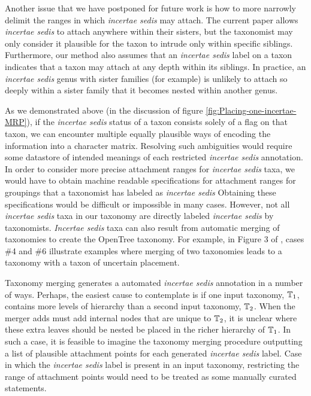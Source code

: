 \documentclass[english]{article}
\begin{document}
Another issue that we have postponed for future work is how to more narrowly delimit
the ranges in which \emph{incertae sedis} may attach.  The current paper allows
\emph{incertae sedis} to attach anywhere within their sisters, but the taxonomist
may only consider it plausible for the taxon to intrude only within specific
siblings.  Furthermore, our method also assumes that an \emph{incertae sedis} label on a taxon
indicates that a taxon may attach at any depth within its siblings.  In practice, an
\emph{incertae sedis} genus with sister families (for example) is unlikely to attach
so deeply within a sister family that it becomes nested within another genus.

As we demonstrated above (in the discussion of figure \ref{fig:Placing-one-incertae-MRP}),
if the \emph{incertae sedis} status of a taxon consists solely of
    a flag on that taxon, we can encounter 
    multiple equally plausible ways of encoding the information
    into a character matrix.
Resolving such ambiguities would require some datastore of intended
    meanings of each restricted \emph{incertae sedis} annotation.
In order to consider more precise attachment ranges for \emph{incertae sedis} taxa,
    we would have to obtain machine readable specifications for attachment ranges
    for groupings that a taxonomist has labeled as \emph{incertae sedis}
Obtaining these specifications would be difficult or impossible in many cases.
However,  not all \emph{incertae sedis} taxa in our taxonomy are directly
labeled \emph{incertae sedis} by taxonomists.
\emph{Incertae sedis}
taxa can also result from automatic merging of taxonomies to create
the OpenTree taxonomy.
For example, in Figure 3 of
\citet{rees2017automated}, cases \#4 and \#6 illustrate examples where
merging of two taxonomies leads to a taxonomy with a taxon of
uncertain placement.

Taxonomy merging generates a automated \emph{incertae sedis} annotation
    in a number of ways.
Perhaps, the easiest cause to contemplate is if
one input taxonomy,
$\mbox{\ensuremath{\mathbb{T}}}_{1}$, contains more levels of hierarchy than a second
input taxonomy,
$\mbox{\ensuremath{\mathbb{T}}}_{2}$.
When the merger adds must add internal nodes that are unique to $\mbox{\ensuremath{\mathbb{T}}}_{2}$,
it is unclear where these
extra leaves should be nested be placed in the richer hierarchy of $\mbox{\ensuremath{\mathbb{T}}}_1$.
In such a case, it is feasible to imagine the taxonomy merging procedure outputting
    a list of plausible attachment points for each generated \emph{incertae sedis}
    label.
Case in which the \emph{incertae sedis} label is present in an input taxonomy,
    restricting the range of attachment points would need to be treated as
    some manually curated statements. 






\end{document}
